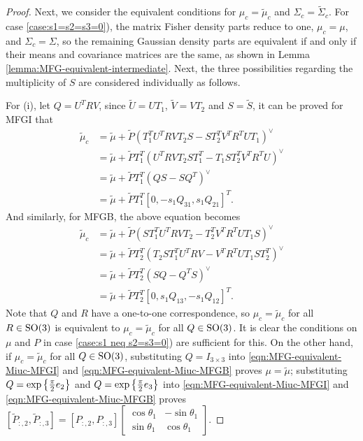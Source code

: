 \begin{proof}
	Next, we consider the equivalent conditions for $\mu_c=\tilde{\mu}_c$ and $\Sigma_c=\tilde{\Sigma}_c$.
	For case \ref{case:s1=s2=s3=0}), the matrix Fisher density parts reduce to one, $\mu_c = \mu$, and $\Sigma_c=\Sigma$, so the remaining Gaussian density parts are equivalent if and only if their means and covariance matrices are the same, as shown in Lemma \ref{lemma:MFG-equivalent-intermediate}.
	Next, the three possibilities regarding the multiplicity of $S$ are considered individually as follows.
	
	For (i), let $Q=U^TRV$, since $\tilde{U}=UT_1$, $\tilde{V}=VT_2$ and $S=\tilde{S}$, it can be proved for MFGI that
	\begin{align} \label{eqn:MFG-equivalent-Miuc-MFGI}
		\tilde{\mu}_c &= \tilde{\mu} + \tilde{P}(T_1^TU^TRVT_2S-ST_2^TV^TR^TUT_1)^\vee \nonumber \\
		&= \tilde{\mu} + \tilde{P}T_1^T(U^TRVT_2ST_1^T-T_1ST_2^TV^TR^TU)^\vee \nonumber \\
		&= \tilde{\mu} + \tilde{P}T_1^T(QS-SQ^T)^\vee \nonumber \\
		&= \tilde{\mu} + \tilde{P}T_1^T[0, -s_1Q_{31}, s_1Q_{21}]^T.
	\end{align}
	And similarly, for MFGB, the above equation becomes
	\begin{align} \label{eqn:MFG-equivalent-Miuc-MFGB}
		\tilde{\mu}_c &= \tilde{\mu} + \tilde{P}(ST_1^TU^TRVT_2-T_2^TV^TR^TUT_1S)^\vee \nonumber \\
		&= \tilde{\mu} + \tilde{P}T_2^T(T_2ST_1^TU^TRV-V^TR^TUT_1ST_2^T)^\vee \nonumber \\
		&= \tilde{\mu} + \tilde{P}T_2^T(SQ-Q^TS)^\vee \nonumber \\
		&= \tilde{\mu} + \tilde{P}T_2^T[0, s_1Q_{13}, -s_1Q_{12}]^T.
	\end{align}
	Note that $Q$ and $R$ have a one-to-one correspondence, so $\mu_c = \tilde{\mu}_c$ for all $R\in\mathrm{SO}(3)$ is equivalent to $\mu_c = \tilde{\mu}_c$ for all $Q\in\mathrm{SO}(3)$.
	It is clear the conditions on $\mu$ and $P$ in case \ref{case:s1 neq s2=s3=0}) are sufficient for this.
	On the other hand, if $\mu_c = \tilde{\mu}_c$ for all $Q\in\mathrm{SO}(3)$, substituting $Q=I_{3 \times 3}$ into \eqref{eqn:MFG-equivalent-Miuc-MFGI} and \eqref{eqn:MFG-equivalent-Miuc-MFGB} proves $\mu=\tilde{\mu}$; substituting $Q = \exp\left\{ \tfrac{\pi}{2}e_2 \right\}$ and $Q = \exp\left\{ \tfrac{\pi}{2}e_3 \right\}$ into \eqref{eqn:MFG-equivalent-Miuc-MFGI} and \eqref{eqn:MFG-equivalent-Miuc-MFGB} proves $[\tilde{P}_{:,2},\tilde{P}_{:,3}] = [P_{:,2},P_{:,3}]\begin{bmatrix} \cos\theta_1 & -\sin\theta_1 \\ \sin\theta_1 & \cos\theta_1\end{bmatrix}$.

\end{proof}
